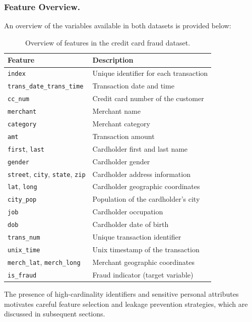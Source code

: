 \documentclass[oneside,12pt,parskip=half,american,numbers=noenddot]{scrreprt}
\begin{document}
\subsubsection{Feature Overview.}
An overview of the variables available in both datasets is provided below:

\begin{table}[H]
\centering
\caption{Overview of features in the credit card fraud dataset.}
\label{tab:dataset_features}
\small
\renewcommand{\arraystretch}{1.2}
\begin{tabular}{ll}
\hline
\textbf{Feature} & \textbf{Description} \\
\hline
\texttt{index} & Unique identifier for each transaction \\
\texttt{trans\_date\_trans\_time} & Transaction date and time \\
\texttt{cc\_num} & Credit card number of the customer \\
\texttt{merchant} & Merchant name \\
\texttt{category} & Merchant category \\
\texttt{amt} & Transaction amount \\
\texttt{first}, \texttt{last} & Cardholder first and last name \\
\texttt{gender} & Cardholder gender \\
\texttt{street}, \texttt{city}, \texttt{state}, \texttt{zip} & Cardholder address information \\
\texttt{lat}, \texttt{long} & Cardholder geographic coordinates \\
\texttt{city\_pop} & Population of the cardholder’s city \\
\texttt{job} & Cardholder occupation \\
\texttt{dob} & Cardholder date of birth \\
\texttt{trans\_num} & Unique transaction identifier \\
\texttt{unix\_time} & Unix timestamp of the transaction \\
\texttt{merch\_lat}, \texttt{merch\_long} & Merchant geographic coordinates \\
\texttt{is\_fraud} & Fraud indicator (target variable) \\
\hline
\end{tabular}
\end{table}

The presence of high-cardinality identifiers and sensitive personal attributes motivates careful feature selection and leakage prevention strategies, which are discussed in subsequent sections.
\end{document}
